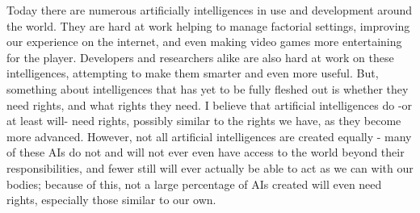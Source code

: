 Today there are numerous artificially intelligences in use and development around the world. They are hard at work helping to manage factorial settings, improving our experience on the internet, and even making video games more entertaining for the player. Developers and researchers alike are also hard at work on these intelligences, attempting to make them smarter and even more useful. But, something about intelligences that has yet to be fully fleshed out is whether they need rights, and what rights they need. I believe that artificial intelligences do -or at least will- need rights, possibly similar to the rights we have, as they become more advanced. However, not all artificial intelligences are created equally - many of these AIs do not and will not ever even have access to the world beyond their responsibilities, and fewer still will ever actually be able to act as we can with our bodies; because of this, not a large percentage of AIs created will even need rights, especially those similar to our own.